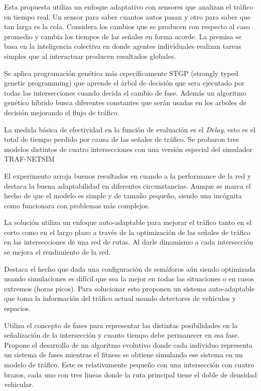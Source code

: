 \begin{itemize}
	
	\begin{item}
		Esta propuesta utiliza un enfoque adaptativo con sensores que analizan el tráfico en tiempo real. Un sensor para saber cuantos autos pasan y otro para saber que tan larga es la cola. Considera los cambios que se producen con respecto al caso promedio y cambia los tiempos de las señales en forma acorde.
		La premisa se basa en la inteligencia colectiva en donde agentes individuales realizan tareas simples que al interactuar producen resultados globales.
		
		Se aplica programación genética más específicamente STGP (strongly typed genetic programming) \citep{Montana1995} que aprende el árbol de decisión que sera ejecutado por todas las intersecciones cuando decida el cambio de fase. Además un algoritmo genético híbrido busca diferentes constantes que serán usadas en los arboles de decisión mejorando el flujo de tráfico.
		
		La medida básica de efectividad en la función de evaluación es el \emph{Delay}, esto es el total de tiempo perdido por causa de las señales de tráfico. Se probaron tres modelos distintos de cuatro intersecciones con una versión especial del simulador  TRAF-NETSIM \citep{TRAF-NETSIM}
		
		El experimento arroja buenos resultados en cuando a la performance de la red y destaca la buena adaptabilidad en diferentes circunstancias. Aunque se marca el hecho de que el modelo es simple y de tamaño pequeño, siendo una incógnita como funcionara con problemas más complejos.
		
	\end{item}	
	
	
	\begin{item}
		\bibentry{Vogel2000}
		
		La solución utiliza un enfoque auto-adaptable para mejorar el tráfico tanto en el corto como en el largo plazo a través de la optimización de las señales de tráfico en las intersecciones de una red de rutas. Al darle dinamismo a cada intersección se mejora el rendimiento de la red.
		
		Destaca el hecho que dada una configuración de semáforos aún siendo optimizada usando simulaciones es difícil que sea la mejor en todas las situaciones o en casos extremos (horas picos). Para solucionar esto proponen un sistema auto-adaptable que toma la información del tráfico actual usando detectores de vehículos y espacios.
		
		Utiliza el concepto de fases para representar las distintas posibilidades en la señalización de la intersección y cuanto tiempo debe permanecer en esa fase. 
		Propone el desarrollo de un algoritmo evolutivo donde cada individuo representa un sistema de fases mientras el fitness se obtiene simulando ese sistema en un modelo de tráfico. Este es relativamente pequeño con una intersección con cuatro brazos, cada uno con tres lineas donde la ruta principal tiene el doble de densidad vehicular. 
		

\end{item}
\end{itemize}
